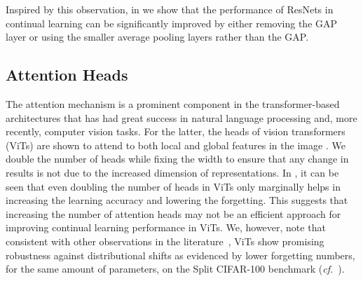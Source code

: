Inspired by this observation, in  we show that the performance of ResNets in continual learning can be significantly improved by either removing the GAP layer or using the smaller average pooling layers rather than the GAP.



\subsection{Attention Heads}
\label{sec:analysis-attention-heads}
The attention mechanism is a prominent component in the transformer-based architectures that has had great success in natural language processing and, more recently, computer vision tasks. For the latter, the heads of vision transformers (ViTs) are shown to attend to both local and global features in the image \cite{VisionTransformerOriginal}. We double the number of heads while fixing the width to ensure that any change in results is not due to the increased dimension of representations. In , it can be seen that even doubling the number of heads in ViTs only marginally helps in increasing the learning accuracy and lowering the forgetting. This suggests that increasing the number of attention heads may not be an efficient approach for improving continual learning performance in ViTs. We, however, note that consistent with other observations in the literature~\citep{paul2022vision}, ViTs show promising robustness against distributional shifts as evidenced by lower forgetting numbers, for the same amount of parameters, on the Split CIFAR-100 benchmark (\emph{cf.}~).

